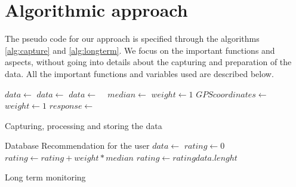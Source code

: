 \section{Algorithmic approach}
The pseudo code for our approach is specified through the algorithms \ref{alg:capture} and \ref{alg:longterm}.
We focus on the important functions and aspects, without going into details about the capturing and preparation of the data.
All the important functions and variables used are described below.
\begin{algorithm}[htbp]
	\begin{algorithmic}[1]
		\Repeat
		\State $data \gets$ 
		\State $data \gets$ 
		\State $data \gets$  
		\State $median \gets$  
		\State $weight \gets 1$ 
		\State $GPScoordinates \gets$ 
		\State $weight \gets 1$  
			\State $response \gets$ 
			 
				\State {}
			\Else
				\State {}			\EndIf
		\EndIf
				
		\State {} 
		\State {}	
	\end{algorithmic}
	\caption{Capturing, processing and storing the data}
	\label{alg:capture}
\end{algorithm}
\begin{algorithm}[htbp]
	\begin{algorithmic}[1]	
		\Require Database
		\Ensure Recommendation for the user
		\Repeat
		\State $data \gets$ 
		\State $rating \gets 0$	
		 
		\State $rating \gets rating + weight * median$
		\EndFor
		\State $rating \gets rating  data.lenght$ 
			\State {}
		\EndIf
	\end{algorithmic}
	\caption{Long term monitoring}
	\label{alg:longterm}
\end{algorithm}

